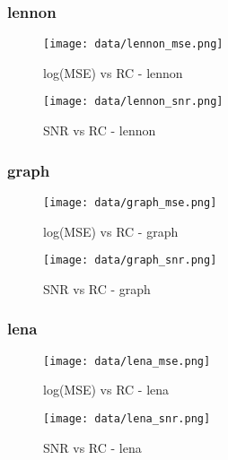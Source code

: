 \documentclass[12pt,a4paper]{article}
\begin{document}
\subsubsection{lennon}
\begin{minipage}{0.5\textwidth}
        \centering
        \begin{figure}[H]
    \centering
    \texttt{[image: data/lennon\_mse.png]}
    \caption{log(MSE) vs RC - lennon}
    \end{figure}
    \end{minipage}\hfill
    \begin{minipage}{0.5\textwidth}
        \begin{figure}[H]
    \centering
    \texttt{[image: data/lennon\_snr.png]}
    \caption{SNR vs RC - lennon}
\end{figure}
\end{minipage}


\subsubsection{graph}
\begin{minipage}{0.5\textwidth}
        \centering
        \begin{figure}[H]
    \centering
    \texttt{[image: data/graph\_mse.png]}
    \caption{log(MSE) vs RC - graph}
    
\end{figure}
\end{minipage}\hfill
    \begin{minipage}{0.5\textwidth}
        \begin{figure}[H]
    \centering
    \texttt{[image: data/graph\_snr.png]}
    \caption{SNR vs RC - graph}
    
\end{figure}
\end{minipage}
\subsubsection{lena}
\begin{minipage}{0.5\textwidth}
        \centering
        \begin{figure}[H]
    \centering
    \texttt{[image: data/lena\_mse.png]}
    \caption{log(MSE) vs RC - lena}
    
\end{figure}
\end{minipage}\hfill
    \begin{minipage}{0.5\textwidth}
        \centering
        \begin{figure}[H]
    \centering
    \texttt{[image: data/lena\_snr.png]}
    \caption{SNR vs RC - lena}
    
\end{figure}
\end{minipage}
\end{document}
